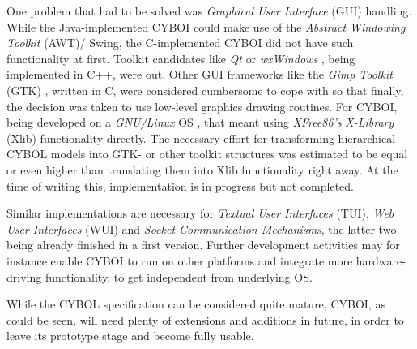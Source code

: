 One problem that had to be solved was \emph{Graphical User Interface} (GUI)
handling. While the Java-implemented CYBOI could make use of the
\emph{Abstract Windowing Toolkit} (AWT)/ Swing, the C-implemented CYBOI did not
have such functionality at first. Toolkit candidates like \emph{Qt} \cite{qt}
or \emph{wxWindows} \cite{wxwidgets}, being implemented in C++, were out. Other
GUI frameworks like the \emph{Gimp Toolkit} (GTK) \cite{gtk}, written in C,
were considered cumbersome to cope with so that finally, the decision was taken
to use low-level graphics drawing routines. For CYBOI, being developed on a
\emph{GNU/Linux} OS \cite{linux}, that meant using \emph{XFree86's}
\cite{xfree86} \emph{X-Library} (Xlib) functionality directly. The necessary
effort for transforming hierarchical CYBOL models into GTK- or other toolkit
structures was estimated to be equal or even higher than translating them into
Xlib functionality right away. At the time of writing this, implementation is
in progress but not completed.

Similar implementations are necessary for \emph{Textual User Interfaces} (TUI),
\emph{Web User Interfaces} (WUI) and \emph{Socket Communication Mechanisms},
the latter two being already finished in a first version. Further development
activities may for instance enable CYBOI to run on other platforms and integrate
more hardware-driving functionality, to get independent from underlying OS.

While the CYBOL specification can be considered quite mature, CYBOI, as could
be seen, will need plenty of extensions and additions in future, in order to
leave its prototype stage and become fully usable.
